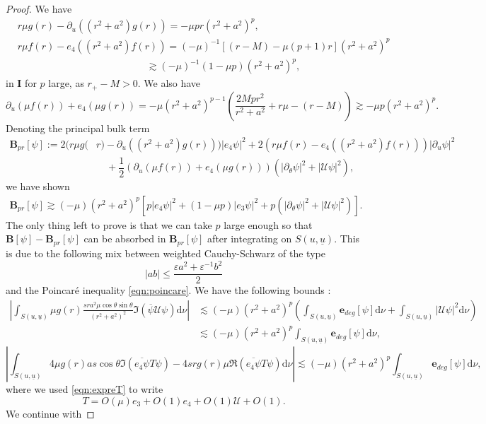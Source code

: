 \documentclass[reqno]{amsart}
\numberwithin{equation}{section}
\newcommand{\intS}{\int_{S(u,\ubar)}}
\newcommand{\ubar}{{\underline{u}}}
\newcommand{\dee}{\mathrm{d}}
\newcommand{\ener}{\mathbf{e}}
\newcommand{\un}{\mathbf{I}}
\theoremstyle{plain}
\theoremstyle{definition}
\theoremstyle{remark}
\numberwithin{equation}{section}
\begin{document}
\begin{proof}
We have 
$$\begin{aligned}
&r \mu g(r)-\partial_u\left(\left(r^2+a^2\right) g(r)\right)  =-\mu p r\left(r^2+a^2\right)^p, \\
&r \mu f(r)-e_4\left(\left(r^2+a^2\right) f(r)\right)  =(-\mu)^{-1}[(r-M)-\mu(p+1) r]\left(r^2+a^2\right)^p\\
&\quad\quad\quad\quad\quad\quad\quad\quad\quad\quad\quad\quad\quad \gtrsim (-\mu)^{-1}(1-\mu p)(r^2+a^2)^p,
\end{aligned}$$
in $\un$ for $p$ large, as $r_+-M>0$. We also have
$$\partial_u(\mu f(r))+e_4(\mu g(r))  =-\mu\left(r^2+a^2\right)^{p-1}\left(\dfrac{2 M p r^2}{r^2+a^2}+r \mu-(r-M)\right)\gtrsim -\mu p(r^2+a^2)^p.
$$ 
Denoting the principal bulk term
\begin{align*}
    \mathbf{B}_{pr}[\psi]:=2(r\mu g(&r)-\partial_u((r^2+a^2)g(r)))|e_4\psi|^2+2(r\mu f(r)-e_4((r^2+a^2)f(r)))|\partial_u\psi|^2\\
    &\quad +\dfrac{1}{2}(\partial_u(\mu f(r))+e_4(\mu g(r)))(|\partial_\theta\psi|^2+|\mathcal{U}\psi|^2),
\end{align*}
we have shown 
\begin{align}\label{eqn:bpr}
    \mathbf{B}_{pr}[\psi]\gtrsim (-\mu)(r^2+a^2)^p[p|e_4\psi|^2+(1-\mu p)|e_3\psi|^2+p(|\partial_\theta\psi|^2+|\mathcal{U}\psi|^2)].
\end{align}
The only thing left to prove is that we can take $p$ large enough so that $\mathbf{B}[\psi]-\mathbf{B}_{pr}[\psi]$ can be absorbed in $\mathbf{B}_{pr}[\psi]$ after integrating on ${S(u,\ubar)}$. This is due to the following mix between weighted Cauchy-Schwarz of the type 
$$|ab|\leq\frac{\varepsilon a^2+\varepsilon^{-1}b^2}{2}$$
and the Poincaré inequality \eqref{eqn:poincare}. We have the following bounds : 
\begin{align*}
    \left|\intS \mu g(r)\frac{sra^2\mu\cos\theta\sin\theta}{(r^2+a^2)^2}\mathfrak{I}(\overline{\psi} \mathcal{U}\psi)\dee\nu\right|&\lesssim (-\mu)(r^2+a^2)^p\left(\intS\ener_{deg}[\psi]\dee\nu+\intS|\mathcal{U}\psi|^2\dee\nu\right)\\
    &\lesssim(-\mu)(r^2+a^2)^p\intS\ener_{deg}[\psi]\dee\nu,
\end{align*}
$$\left|\intS4\mu g(r)as\cos\theta\mathfrak{I}(\overline{e_4\psi}T\psi)-4srg(r)\mu\mathfrak{R}(\overline{e_4\psi}T\psi)\dee\nu\right|\lesssim(-\mu)(r^2+a^2)^p\intS\ener_{deg}[\psi]\dee\nu,$$
where we used \eqref{eqn:expreT} to write
$$T=O(\mu)e_3+O(1)e_4+O(1)\mathcal{U}+O(1).$$
We continue with 

\end{proof}
\end{document}
